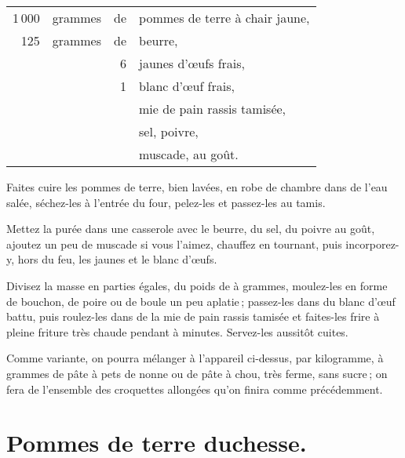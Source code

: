 \footnotesize
\begin{longtable}{rrrp{16em}}
  1 000 & grammes & de & pommes de terre à chair jaune,                                                   \\
    125 & grammes & de & beurre,                                                                          \\
        &         &  6 & jaunes d'œufs frais,                                                             \\
        &         &  1 & blanc d'œuf frais,                                                               \\
        &         &    & mie de pain rassis tamisée,                                                      \\
        &         &    & sel, poivre,                                                                     \\
        &         &    & muscade, au goût.                                                                \\
\end{longtable}
\normalsize

Faites cuire les pommes de terre, bien lavées, en robe de chambre dans de
l'eau salée, séchez-les à l'entrée du four, pelez-les et passez-les au tamis.

Mettez la purée dans une casserole avec le beurre, du sel, du poivre au goût,
ajoutez un peu de muscade si vous l'aimez, chauffez en tournant, puis
incorporez-y, hors du feu, les jaunes et le blanc d'œufs.

Divisez la masse en parties égales, du poids de {\mmm} à {\mmm}
grammes, moulez-les en forme de bouchon, de poire ou de boule un peu aplatie ;
passez-les dans du blanc d'œuf battu, puis roulez-les dans de la mie de pain
rassis tamisée et faites-les frire à pleine friture très chaude pendant
{\mmm} à {\mmm} minutes. Servez-les aussitôt cuites.

\sk

Comme variante, on pourra mélanger à l'appareil ci-dessus, par kilogramme,
{\mmm} à {\mmm} grammes de pâte à pets de nonne ou de pâte
à chou, très ferme, sans sucre ; on fera de l'ensemble des croquettes allongées
qu'on finira comme précédemment.

\section*{\centering Pommes de terre duchesse.}
{}
\label{pg0725} \hypertarget{p0725}{}

